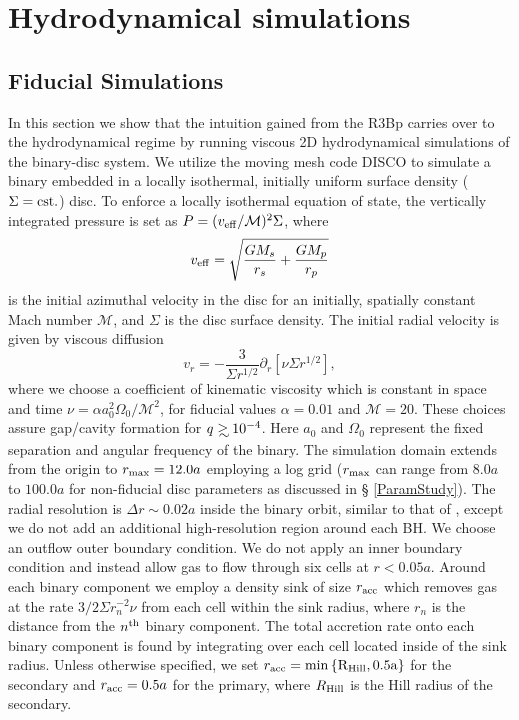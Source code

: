 \documentclass[usenatbib]{mnras}
\newcommand\gsim{\mathrel{\rlap{\lower4pt\hbox{\hskip1pt$\sim$}}
        \raise1pt\hbox{$>$}}}
\def\Mach{\mathcal{M}}
\begin{document}
\section{Hydrodynamical simulations}
\label{Hydrodynamical Simulations}
\subsection{Fiducial Simulations}
\label{Fiducial Simulations}
In this section we show that the intuition gained from the R3Bp
carries over to the hydrodynamical regime by running viscous 2D
hydrodynamical simulations of the binary-disc system.  We utilize the
moving mesh code DISCO \citep{Duffell:2011:TESS} to simulate a binary
embedded in a locally isothermal, initially uniform surface density
($\Sigma = \rm{cst.}$) disc. To enforce a locally isothermal equation
of state, the vertically integrated pressure is set as
$P=(v_{\rm{eff}} / \Mach)^2 \Sigma$, where
\begin{equation}
v_{\rm{eff}} =  \sqrt{\frac{GM_s}{r_s} + \frac{GM_p}{r_p}}
\end{equation}
is the initial azimuthal velocity in the disc for an initially,
spatially constant Mach number $\Mach$, and $\Sigma$ is the disc
surface density. The initial radial velocity is given by viscous
diffusion
\begin{equation}
v_r = - \frac{3}{\Sigma r^{1/2}} \partial_{r}\left[ \nu \Sigma  r^{1/2}\right],
\end{equation}
where we choose a coefficient of kinematic viscosity which is constant
in space and time $\nu = \alpha a^2_0 \Omega_{0} /\Mach^2$, for
fiducial values $\alpha = 0.01$ and $\Mach = 20$. These choices assure
gap/cavity formation for $q\gsim10^{-4}$. Here $a_0$ and $\Omega_0$
represent the fixed separation and angular frequency of the
binary. The simulation domain extends from the origin to $r_{\rm{max}} = 12.0a$
employing a log grid ($r_{\rm{max}}$ can range from $8.0a$ to $100.0a$
for non-fiducial disc parameters as discussed in \S
\ref{ParamStudy}). The radial resolution is $\Delta r \sim 0.02a$
inside the binary orbit, similar to that of \cite{Farris:2014}, except
we do not add an additional high-resolution region around each BH. We
choose an outflow outer boundary condition. We do not apply an inner
boundary condition and instead allow gas to flow through six cells at
$r<0.05a$. Around each binary component we employ a density sink of
size $r_{\rm{acc}}$ which removes gas at the rate $3/2 \Sigma r^{-2}_n
\nu$ from each cell within the sink radius, where $r_n$ is the
distance from the $n^{\rm{th}}$ binary component. The total accretion
rate onto each binary component is found by integrating over each cell
located inside of the sink radius. Unless otherwise specified, we set
$r_{\rm{acc}} = \rm{min}\left\{ R_{\rm{Hill}}, 0.5a \right\}$ for the
secondary and $r_{\rm{acc}}= 0.5a$ for the primary, where
$R_{\rm{Hill}}$ is the Hill radius of the secondary.
\end{document}
